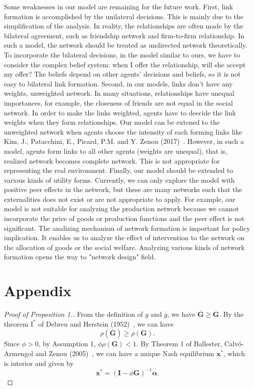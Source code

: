 \documentclass[12pt]{article}
\theoremstyle{definition}
\newcommand{\bm}[1]{\boldsymbol{#1}}
\begin{document}
Some weaknesses in our model are remaining for the future work.
First, link formation is accomplished by the unilateral decisions.
This is mainly due to the simplification of the analysis.
In reality, the relationships are often made by the bilateral agreement, such as friendship network and firm-to-firm relationship.
In such a model, the network should be treated as undirected network theoretically.
To incorporate the bilateral decisions, in the model similar to ours, we have to consider the complex belief system: when I offer the relationship, will she accept my offer?
The beliefs depend on other agents' decisions and beliefs, so it is not easy to bilateral link formation.
Second, in our models, links don't have any weights, unweighted network.
In many situations, relationships have unequal importances, for example, the closeness of friends are not equal in the social network.
In order to make the links weighted, agents have to deecide the link weights when they form relationships.
Our model can be extened to the unweighted network when agents choose the intensity of each forming links like Kim, J., Patacchini, E., Picard, P.M. and Y. Zenou (2017)~\cite{Urban}.
However, in such a model, agents form links to all other agents (weights are unequal), that is, realized network becomes complete network.
This is not appropriate for representing the real environment.
Finally, our model should be extended to various kinds of utility forms.
Currently, we can only explore the model with positive peer effects in the network, but these are many networks such that the externalities does not exist or are not appropriate to apply.
For example, our model is not suitable for analyzing the production network because we cannot incorporate the price of goods or production functions and the peer effect is not significant.
The analizing mechanism of network formation is important for policy implication.
It enables us to analyze the effect of intervention to the network on the allocation of goods or the social welfare.
Analyzing various kinds of network formation opens the way to "network design" field.

\appendix

\section{Appendix}

\begin{proof}[Proof of Proposition 1.]
	From the definition of $g$ and $\overline{g}$, we have $\bm{\overline{G}} \ge \bm{G}$.
	By the theorem $\text{I}^*$ of Debreu and Herstein (1952)~\cite{debreu}, we can have
	\begin{equation*}
		\rho(\bm{\overline{G}}) \ge \rho(\bm{G}).
	\end{equation*}
	Since $\phi > 0$, by Assumption 1, $\phi \rho(\bm{G}) < 1$.
	By Theorem 1 of Ballester, Calv\'{o}-Armengol and Zenou (2005)~\cite{whowho}, we can have a unique Nash equilibrium $\bm{x}^*$, which is interior and given by
	\[ \bm{x}^* = {(\bm{I} - \phi \bm{G})}^{-1} \bm{\alpha}. \] 
\end{proof}
\end{document}
